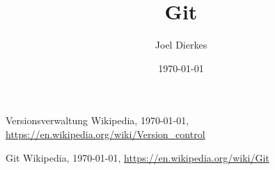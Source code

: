 \documentclass{beamer}
\title{Git}
\author{Joel Dierkes}
\date{\today}
\begin{document}
\maketitle
\frame{\tableofcontents[currentsection]}



\begin{thebibliography}{9}

  Versionsverwaltung Wikipedia,
  \today,
  \url{https://en.wikipedia.org/wiki/Version_control}

  Git Wikipedia,
  \today,
  \url{https://en.wikipedia.org/wiki/Git}

\end{thebibliography}
\end{document}
